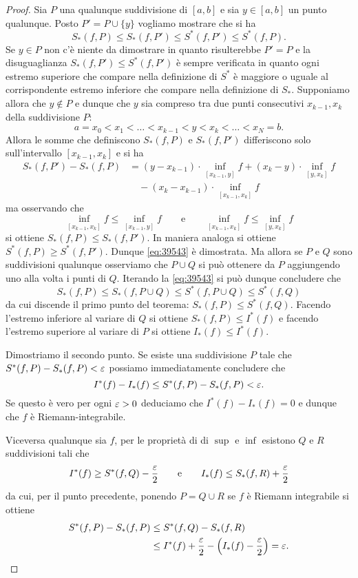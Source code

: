 \begin{proof}
Sia $P$ una qualunque suddivisione di $[a,b]$ e sia $y\in [a,b]$ un punto qualunque. Posto $P' = P \cup \{y\}$ vogliamo mostrare
che si ha
\begin{equation}\label{eq:39543}
  S_*(f,P) \le S_*(f,P') \le S^*(f,P') \le S^*(f,P).
\end{equation}
Se $y\in P$ non c'è niente da dimostrare in quanto
risulterebbe $P'=P$ e la disuguaglianza $S_*(f,P') \le S^*(f,P')$ è sempre verificata in quanto ogni estremo superiore che compare nella definizione di $S^*$ è maggiore o uguale al corrispondente
estremo inferiore che compare nella definizione di $S_*$.
Supponiamo allora che $y \not \in P$ e dunque che $y$ sia compreso tra due punti consecutivi $x_{k-1}, x_k$ della suddivisione $P$:
\[
  a= x_0 < x_1 < \dots < x_{k-1} < y < x_k < \dots < x_N=b.
\]
Allora le somme che definiscono $S_*(f,P)$ e $S_*(f,P')$ differiscono solo sull'intervallo $[x_{k-1},x_k]$ e si ha
\begin{align*}
  S_*(f,P') - S_*(f,P)
  &= (y-x_{k-1})\cdot \!\!\inf_{[x_{k-1},y]}\!\!\! f
  + (x_k - y)\cdot\! \inf_{[y,x_k]}\! f\\
  &\quad - (x_k - x_{k-1})\cdot \!\!\inf_{[x_{k-1}, x_k]}\!\!\!f
\end{align*}
ma osservando che
\[
\inf_{[x_{k-1}, x_k]}\!\!f
\le\inf_{[x_{k-1},y]}\!\! f
\qquad \text{e} \qquad
\inf_{[x_{k-1}, x_k]}\!\!f
\le\inf_{[y,x_k]}\!\! f
\]
si ottiene $S_*(f,P) \le S_*(f,P')$.
In maniera analoga si ottiene $S^*(f,P) \ge S^*(f,P')$.
Dunque \eqref{eq:39543} è dimostrata.
Ma allora se $P$ e $Q$ sono suddivisioni qualunque osserviamo che $P\cup Q$ si può ottenere da $P$ aggiungendo uno alla volta i punti di $Q$. Iterando la \eqref{eq:39543} si può dunque concludere che
\[
 S_*(f,P) \le S_*(f,P\cup Q) \le S^*(f,P\cup Q) \le S^*(f,Q)
\]
da cui discende il primo punto del teorema: $S_*(f,P) \le S^*(f,Q)$.
Facendo l'estremo inferiore al variare di $Q$
si ottiene $S_*(f,P) \le I^*(f)$ e facendo l'estremo superiore al variare di $P$ si ottiene $I_*(f) \le I^*(f)$.

Dimostriamo il secondo punto.
Se esiste una suddivisione $P$ tale che $S^*(f,P)-S_*(f,P) < \varepsilon$ possiamo immediatamente concludere che
\[
I^*(f) - I_*(f) \le S^*(f,P) - S_*(f,P) < \varepsilon.
\]
Se questo è vero per ogni $\varepsilon >0$ deduciamo che $I^*(f) - I_*(f) = 0$ e dunque che $f$ è Riemann-integrabile.

Viceversa qualunque sia $f$, per le proprietà di
di $\sup$ e $\inf$
esistono $Q$ e $R$ suddivisioni tali che
\[
  I^*(f) \ge S^*(f,Q) - \frac{\varepsilon} 2
  \qquad\text{e}\qquad
  I_*(f) \le S_*(f,R) + \frac{\varepsilon} 2
\]
da cui, per il punto precedente, ponendo $P=Q\cup R$
se $f$ è Riemann integrabile
si ottiene
\begin{align*}
S^*(f,P)-S_*(f,P) &\le S^*(f,Q) - S_*(f,R) \\
&\le I^*(f) + \frac{\varepsilon} 2 - {\left( I_*(f) - \frac {\varepsilon} 2 \right)} = \varepsilon.
\end{align*}


\end{proof}
